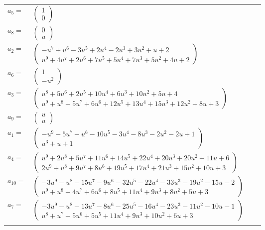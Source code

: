 \documentclass[1p]{elsarticle_modified}
\theoremstyle{definition}
\begin{document}
\begin{tabular}{m{7pt} m{180pt} m{7pt} m{180pt} }
\flushright $a_{5}=$&$\begin{pmatrix}1\\0\end{pmatrix}$ \\
\flushright $a_{8}=$&$\begin{pmatrix}0\\u\end{pmatrix}$ \\
\flushright $a_{2}=$&$\begin{pmatrix}- u^7+u^6-3 u^5+2 u^4-2 u^3+3 u^2+u+2\\u^9+4 u^7+2 u^6+7 u^5+5 u^4+7 u^3+5 u^2+4 u+2\end{pmatrix}$ \\
\flushright $a_{6}=$&$\begin{pmatrix}1\\- u^2\end{pmatrix}$ \\
\flushright $a_{3}=$&$\begin{pmatrix}u^8+5 u^6+2 u^5+10 u^4+6 u^3+10 u^2+5 u+4\\u^9+u^8+5 u^7+6 u^6+12 u^5+13 u^4+15 u^3+12 u^2+8 u+3\end{pmatrix}$ \\
\flushright $a_{9}=$&$\begin{pmatrix}u\\u\end{pmatrix}$ \\
\flushright $a_{1}=$&$\begin{pmatrix}- u^9-5 u^7- u^6-10 u^5-3 u^4-8 u^3-2 u^2-2 u+1\\u^3+u+1\end{pmatrix}$ \\
\flushright $a_{4}=$&$\begin{pmatrix}u^9+2 u^8+5 u^7+11 u^6+14 u^5+22 u^4+20 u^3+20 u^2+11 u+6\\2 u^9+u^8+9 u^7+8 u^6+19 u^5+17 u^4+21 u^3+15 u^2+10 u+3\end{pmatrix}$ \\
\flushright $a_{10}=$&$\begin{pmatrix}-3 u^9- u^8-15 u^7-9 u^6-32 u^5-22 u^4-33 u^3-19 u^2-15 u-2\\u^9+u^8+4 u^7+6 u^6+8 u^5+11 u^4+9 u^3+8 u^2+5 u+3\end{pmatrix}$ \\
\flushright $a_{7}=$&$\begin{pmatrix}-3 u^9- u^8-13 u^7-8 u^6-25 u^5-16 u^4-23 u^3-11 u^2-10 u-1\\u^8+u^7+5 u^6+5 u^5+11 u^4+9 u^3+10 u^2+6 u+3\end{pmatrix}$\\&\end{tabular}
\end{document}
